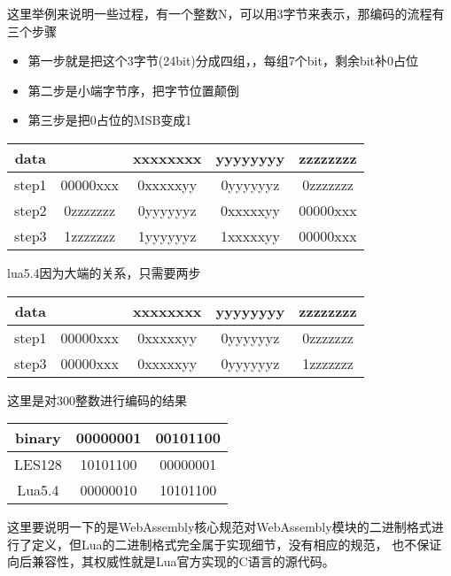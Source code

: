 这里举例来说明一些过程，有一个整数N，可以用3字节来表示，那编码的流程有三个步骤
\begin{itemize}
    \item {第一步就是把这个3字节(24bit)分成四组，，每组7个bit，剩余bit补0占位}
    \item {第二步是小端字节序，把字节位置颠倒}
    \item {第三步是把0占位的MSB变成1}
\end{itemize}
\begin{center}
    \begin{tabular}{|c|c|c|c|c|} \hline
       \hbox{data} & \hbox{} & \hbox{xxxxxxxx} & \hbox{yyyyyyyy} & \hbox{zzzzzzzz} \\ \hline
       \hbox{step1} & \hbox{00000xxx} & \hbox{0xxxxxyy} & \hbox{0yyyyyyz}  & \hbox{0zzzzzzz} \\ \hline
       \hbox{step2} & \hbox{0zzzzzzz} & \hbox{0yyyyyyz} & \hbox{0xxxxxyy}  & \hbox{00000xxx} \\ \hline
       \hbox{step3} & \hbox{1zzzzzzz} & \hbox{1yyyyyyz} & \hbox{1xxxxxyy}  & \hbox{00000xxx} \\ \hline
    \end{tabular}
\end{center}
lua5.4因为大端的关系，只需要两步
\begin{center}
    \begin{tabular}{|c|c|c|c|c|} \hline
       \hbox{data} & \hbox{} & \hbox{xxxxxxxx} & \hbox{yyyyyyyy} & \hbox{zzzzzzzz} \\ \hline
       \hbox{step1} & \hbox{00000xxx} & \hbox{0xxxxxyy} & \hbox{0yyyyyyz}  & \hbox{0zzzzzzz} \\ \hline
       \hbox{step3} & \hbox{00000xxx} & \hbox{0xxxxxyy} & \hbox{0yyyyyyz}  & \hbox{1zzzzzzz} \\ \hline
    \end{tabular}
\end{center}
这里是对300整数进行编码的结果
\begin{center}
    \begin{tabular}{|c|c|c|} \hline
       \hbox{binary} & \hbox{00000001} & \hbox{00101100} \\ \hline
       \hbox{LES128} & \hbox{10101100} & \hbox{00000001} \\ \hline
       \hbox{Lua5.4} & \hbox{00000010} & \hbox{10101100} \\ \hline
    \end{tabular}
\end{center}

这里要说明一下的是WebAssembly核心规范对WebAssembly模块的二进制格式进行了定义，但Lua的二进制格式完全属于实现细节，没有相应的规范，
也不保证向后兼容性，其权威性就是Lua官方实现的C语言的源代码。
